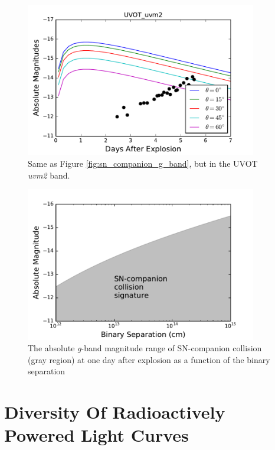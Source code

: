 \documentclass[11pt]{article}
\begin{document}
\begin{figure}[htb]
  \centering
  \includegraphics[width=0.9\textwidth]{UVOT_uvm2.pdf}
  \caption{Same as Figure \ref{fig:sn_companion_g_band}, but in the UVOT \textit{uvm2} band.}
  \label{fig:sn_companion_uvm2_band}
\end{figure}

\begin{figure}[htb]
  \centering
  \includegraphics[width=0.9\textwidth]{g_band_a_vs_theta.pdf}
  \caption{The absolute \textit{g}-band magnitude range of
    SN-companion collision (gray region) at one day after explosion as
    a function of the binary separation}
  \label{fig:sn_companion_range}
\end{figure}

\section{Diversity Of Radioactively Powered Light Curves}
\label{sec:diversity_of_radioactively_powered_light_curves}
\end{document}
